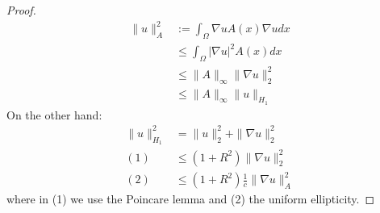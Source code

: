 \documentclass[a4paper,11pt,oneside,fleqn]{book}
\theoremstyle{definition}
\theoremstyle{remark}
\begin{document}
\begin{proof}
	\begin{align*}
		\|u\|_A^2 &:= \int_\Omega \nabla u A(x) \nabla u dx\\ 
		&\leq \int_\Omega |\nabla u|^2 A(x)dx\\
		&\leq \|A\|_\infty \|\nabla u\|_2^2 \\
		&\leq \|A\|_\infty \|u\|_{H_1}
	\end{align*}
	On the other hand:
	\begin{align*}
		\|u\|_{H_1}^2 &= \|u\|_2^2 + \|\nabla u\|^2_2\\
		(1)&\leq (1 + R^2) \|\nabla u\|^2_2\\
		(2)&\leq (1 + R^2) \frac{1}{c} \|\nabla u\|_A^2
	\end{align*}
	where in (1) we use the Poincare lemma and (2) the uniform ellipticity.
\end{proof}
\end{document}
